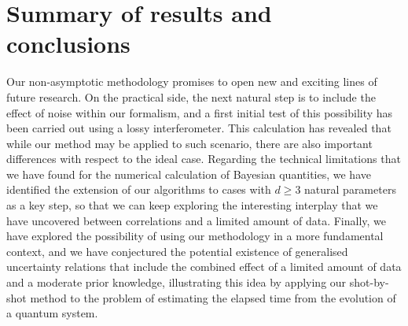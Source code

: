 \section{Summary of results and conclusions}

Our non-asymptotic methodology promises to open new and exciting lines of future research. On the practical side, the next natural step is to include the effect of noise within our formalism, and a first initial test of this possibility has been carried out using a lossy interferometer. This calculation has revealed that while our method may be applied to such scenario, there are also important differences with respect to the ideal case. Regarding the technical limitations that we have found for the numerical calculation of Bayesian quantities, we have identified the extension of our algorithms to cases with $d\geqslant 3 $ natural parameters as a key step, so that we can keep exploring the interesting interplay that we have uncovered between correlations and a limited amount of data. Finally, we have explored the possibility of using our methodology in a more fundamental context, and we have conjectured the potential existence of generalised uncertainty relations that include the combined effect of a limited amount of data and a moderate prior knowledge, illustrating this idea by applying our shot-by-shot method to the problem of estimating the elapsed time from the evolution of a quantum system. 
